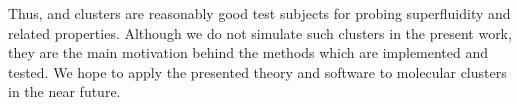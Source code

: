 Thus,  and \paraH{} clusters are reasonably good test subjects for probing superfluidity and related properties.
Although we do not simulate such clusters in the present work, they are the main motivation behind the methods which are implemented and tested.
We hope to apply the presented theory and software to molecular clusters in the near future.
